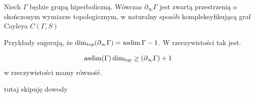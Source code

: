   Niech $\Gamma$ będzie grupą hiperboliczną. Wówczas $\partial_\infty \Gamma$ jest zwartą przestrzenią o skończonym wymiarze topologicznym, w naturalny sposób kompleksyfikującą graf Cayleya $C(\Gamma,S)$

Przykłady sugerują, że $\dim_{top}(\partial_\infty\Gamma)=\operatorname{asdim}\Gamma-1$. W rzeczywistości tak jest.

\begin{theorem}{}{}
  $$\operatorname{asdim}(\Gamma)\dim_{top}\geq(\partial_\infty \Gamma)+1$$
  w rzeczywistości mamy równość.
\end{theorem}

{\color{red} tutaj skipuję dowody}



